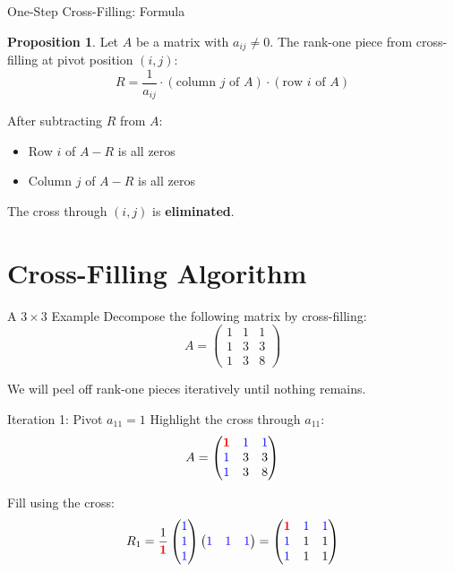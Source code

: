 \documentclass[10pt]{beamer}
\theoremstyle{definition}
\newtheorem{prop}{Proposition}[section]
\newcommand{\pvt}[1]{{\color{red}\mathbf{#1}}}       %
\newcommand{\crs}[1]{{\color{blue}#1}}                %
\newcommand{\x}[1]{\alert{\textbf{#1}}}
\begin{document}
\begin{frame}{One-Step Cross-Filling: Formula}
\begin{prop}
Let $A$ be a matrix with $a_{ij} \neq 0$. The rank-one piece from cross-filling at pivot position $(i,j)$:
$$R = \frac{1}{a_{ij}} \cdot (\text{column } j \text{ of } A) \cdot (\text{row } i \text{ of } A)$$
\end{prop}

\vfill
After subtracting $R$ from $A$:
\begin{itemize}
\item Row $i$ of $A - R$ is all zeros
\item Column $j$ of $A - R$ is all zeros
\end{itemize}

\vfill
The cross through $(i,j)$ is \x{eliminated}.
\end{frame}

\section{Cross-Filling Algorithm}

\begin{frame}{A $3 \times 3$ Example}
Decompose the following matrix by cross-filling:
$$A = \begin{pmatrix}
1 & 1 & 1 \\
1 & 3 & 3 \\
1 & 3 & 8
\end{pmatrix}$$

\vfill
We will peel off rank-one pieces iteratively until nothing remains.
\end{frame}

\begin{frame}{Iteration 1: Pivot $a_{11} = 1$}
Highlight the cross through $a_{11}$:
$$A = \begin{pmatrix}
\pvt{1} & \crs{1} & \crs{1} \\
\crs{1} & 3 & 3 \\
\crs{1} & 3 & 8
\end{pmatrix}$$

\vfill
Fill using the cross:
$$R_1 = \frac{1}{\pvt{1}}
\begin{pmatrix} \crs{1} \\ \crs{1} \\ \crs{1} \end{pmatrix}
\begin{pmatrix} \crs{1} & \crs{1} & \crs{1} \end{pmatrix}
= \begin{pmatrix}
\pvt{1} & \crs{1} & \crs{1} \\
\crs{1} & 1 & 1 \\
\crs{1} & 1 & 1
\end{pmatrix}$$
\end{frame}
\end{document}
